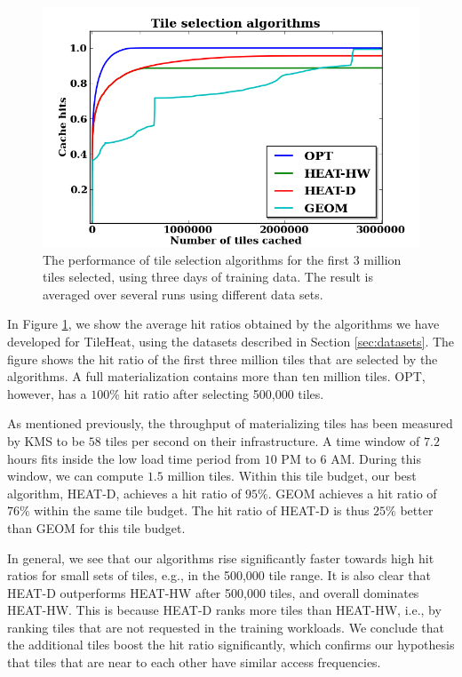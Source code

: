\documentclass[11pt, oneside]{report}
\begin{document}
\begin{figure}
\centering
\includegraphics[scale=0.4]{figs-tileheat/results_closeup2.png}
\caption{The performance of tile selection algorithms for the first 3 million tiles selected, using three days of training data. The result is averaged over several runs using different data sets.}
\label{fig:results}
\end{figure}

In Figure \ref{fig:results}, we show the average hit ratios obtained by the algorithms we have developed for TileHeat, using the datasets described in Section \ref{sec:datasets}. 
The figure shows the hit ratio of the first three million tiles that are selected by the algorithms. A full materialization contains more than ten million tiles. OPT, however, has a $100\%$ hit ratio after selecting 500,000 tiles. 

As mentioned previously, the throughput of materializing tiles has been measured by KMS to be $58$ tiles per second on their infrastructure. A time window of $7.2$ hours fits inside the low load time period from $10$ PM to $6$ AM. During this window, we can compute $1.5$ million tiles. Within this tile budget, our best algorithm, HEAT-D, achieves a hit ratio of $95\%$. GEOM achieves a hit ratio of $76\%$ within the same tile budget. The hit ratio of HEAT-D is thus $25\%$ better than GEOM for this tile budget.

In general, we see that our algorithms rise significantly faster towards high hit ratios for small sets of tiles, e.g., in the 500,000 tile range. It is also clear that HEAT-D outperforms HEAT-HW after 500,000 tiles, and overall dominates HEAT-HW. This is because HEAT-D ranks more tiles than HEAT-HW, i.e., by ranking tiles that are not requested in the training workloads. We conclude that the additional tiles boost the hit ratio significantly, which confirms our hypothesis that tiles that are near to each other have similar access frequencies.
\end{document}
